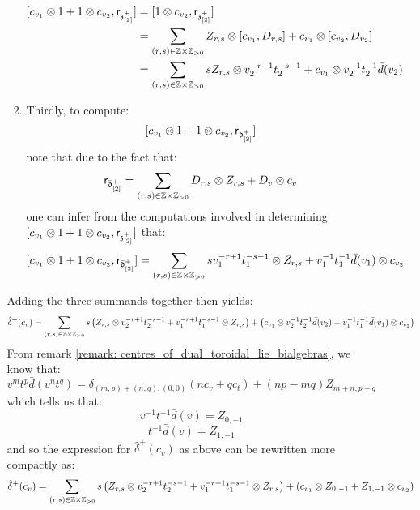 \begin{remark}
\begin{enumerate}
\begin{enumerate}
\begin{enumerate}
$$\begin{aligned}
                                         [c_{v_1} \tensor 1 + 1 \tensor c_{v_2}, \sfr_{\z_{[2]}^+}] & = [1 \tensor c_{v_2}, \sfr_{\z_{[2]}^+}]
                                         \\
                                         & = \sum_{(r, s) \in \Z \x \Z_{> 0}} Z_{r, s} \tensor [c_{v_1}, D_{r, s}] + c_{v_1} \tensor [c_{v_2}, D_{v_2}]
                                         \\
                                         & = \sum_{(r, s) \in \Z \x \Z_{> 0}} s Z_{r, s} \tensor v_2^{-r + 1} t_2^{-s - 1} + c_{v_1} \tensor v_2^{-1} t_2^{-1} \bar{d}(v_2)
                                    \end{aligned}
                                $$
                            \item Thirdly, to compute:
                                $$[c_{v_1} \tensor 1 + 1 \tensor c_{v_2}, \sfr_{\bar{\d}_{[2]}^+}]$$
                            note that due to the fact that:
                                $$\sfr_{ \bar{\d}_{[2]}^+ } = \sum_{(r, s) \in \Z \x \Z_{> 0}} D_{r, s} \tensor Z_{r, s} + D_v \tensor c_v$$
                            one can infer from the computations involved in determining $[c_{v_1} \tensor 1 + 1 \tensor c_{v_2}, \sfr_{\z_{[2]}^+}]$ that:
                                $$[c_{v_1} \tensor 1 + 1 \tensor c_{v_2}, \sfr_{\bar{\d}_{[2]}^+}] = \sum_{(r, s) \in \Z \x \Z_{> 0}} s v_1^{-r + 1} t_1^{-s - 1} \tensor Z_{r, s} + v_1^{-1} t_1^{-1} \bar{d}(v_1) \tensor c_{v_2}$$
                        \end{enumerate}
                        
                        Adding the three summands together then yields:
                            $$\hat{\delta}^+(c_v) = \sum_{(r, s) \in \Z \x \Z_{> 0}} s \left( Z_{r, s} \tensor v_2^{-r + 1} t_2^{-s - 1} + v_1^{-r + 1} t_1^{-s - 1} \tensor Z_{r, s} \right) + \left( c_{v_1} \tensor v_2^{-1} t_2^{-1} \bar{d}(v_2) + v_1^{-1} t_1^{-1} \bar{d}(v_1) \tensor c_{v_2} \right)$$
                        From remark \ref{remark: centres_of_dual_toroidal_lie_bialgebras}, we know that:
                            $$v^m t^p \bar{d}(v^n t^q) = \delta_{(m, p) + (n, q), (0, 0)} ( n c_v + q c_t ) + (np - mq) Z_{m + n, p + q}$$
                        which tells us that:
                            $$v^{-1} t^{-1} \bar{d}(v) = Z_{0, -1}$$
                            $$t^{-1} \bar{d}(v) = Z_{1, -1}$$
                        and so the expression for $\hat{\delta}^+(c_v)$ as above can be rewritten more compactly as:
                            $$\hat{\delta}^+(c_v) = \sum_{(r, s) \in \Z \x \Z_{> 0}} s \left( Z_{r, s} \tensor v_2^{-r + 1} t_2^{-s - 1} + v_1^{-r + 1} t_1^{-s - 1} \tensor Z_{r, s} \right) + \left( c_{v_1} \tensor Z_{0, -1} + Z_{1, -1} \tensor c_{v_2} \right)$$
                        

\end{enumerate}
\end{enumerate}
\end{remark}
